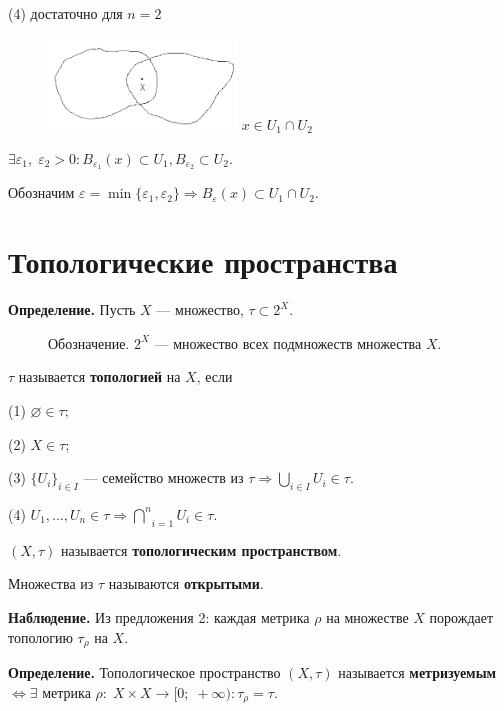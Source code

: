\documentclass[12pt,a4paper]{article}
\begin{document}
(4) достаточно для $n = 2$

\begin{figure}
	\includegraphics[width = 5cm]{lect2_3.png}
	$x \in U_1 \cap U_2$
\end{figure}

$\exists \varepsilon_1, \; \varepsilon_2 > 0\!\!: B_{\varepsilon_1}(x) \subset U_1, B_{\varepsilon_2} \subset U_2.$

Обозначим $\varepsilon = \min\{\varepsilon_1, \varepsilon_2\} \Rightarrow B_{\varepsilon}(x) \subset  U_1 \cap U_2.$

\section{Топологические пространства}

\textbf{Определение.} Пусть $X$ --- множество, $\tau \subset 2^{X}.$

\begin{figure}
	Обозначение. $2^{X}$ --- множество всех подмножеств множества $X.$
\end{figure}

$\tau$ называется \textbf{топологией} на $X$, если

(1) $\varnothing \in \tau;$

(2) $X \in \tau;$

(3) $\{U_i\}_{i \in I}$ --- семейство множеств из $\tau \Rightarrow \underset{i \in I}{\bigcup} U_i \in \tau.$

(4) $U_1, ..., U_n \in \tau \Rightarrow \underset{i = 1}{\overset{n}{\bigcap}} U_i \in \tau.$

$\left(X, \tau \right)$ называется \textbf{топологическим пространством}.

Множества из $\tau$ называются \textbf{открытыми}.

\textbf{Наблюдение.} Из предложения 2: каждая метрика $\rho$ на множестве $X$ порождает топологию $\tau_{\rho}$ на $X.$

\textbf{Определение.} Топологическое пространство $(X, \tau)$ называется \textbf{метризуемым} $\Leftrightarrow \exists$ метрика $\rho\!\!: \; X\times X \to [0;\; +\infty)\!\!: \tau_{\rho} = \tau.$
\end{document}
